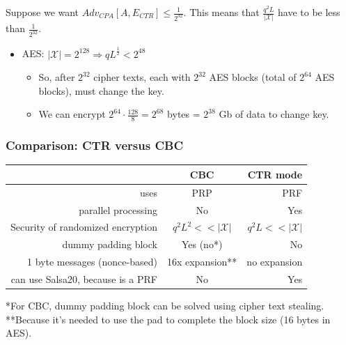 \documentclass[12pt]{book}
\begin{document}
Suppose we want $Adv_{CPA}[A,E_{CTR}]\leq \frac{1}{2^{32}}$. This means that $\frac{q^{2}L}{|\mathcal{X}|}$ have to be less than $\frac{1}{2^{32}}$.
\begin{itemize}
	\item AES: $|\mathcal{X}|=2^{128}\Rightarrow qL^{\frac{1}{2}}<2^{48}$
	\begin{itemize}
		\item[] So, after $2^{32}$ cipher texts, each with $2^{32}$ AES blocks (total of $2^{64}$ AES blocks), must change the key.
		\item[] We can encrypt $2^{64}\cdot \frac{128}{8}=2^{68}$ bytes = $2^{38}$ Gb of data to change key.
	\end{itemize}
\end{itemize}

\subsubsection{Comparison: CTR versus CBC}
\begin{center}
	\begin{tabular}{N{.3}cN{.2}}
		\hline
		&\textbf{CBC}&\textbf{CTR mode}\\\hline
		uses & PRP & PRF\\
		parallel processing & No & Yes\\
		Security of randomized encryption & $q^{2}L^{2}<<|\mathcal{X}|$ & $q^{2}L<<|\mathcal{X}|$\\
		dummy padding block & Yes (no*) & No\\
		1 byte messages (nonce-based) & 16x expansion** & no expansion\\
		can use Salsa20, because is a PRF& No & Yes\\\hline
	\end{tabular}
\end{center}*For CBC, dummy padding block can be solved using cipher text stealing.\\
**Because it's needed to use the pad to complete the block size (16 bytes in AES).
\end{document}
